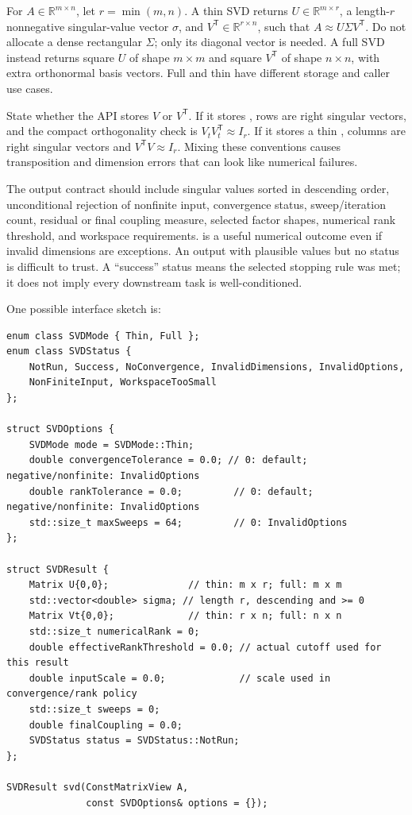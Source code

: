 For \(A\in\mathbb R^{m\times n}\), let \(r=\min(m,n)\). A thin SVD returns \(U\in\mathbb R^{m\times r}\), a length-\(r\) nonnegative singular-value vector \(\sigma\), and \(V^\mathsf T\in\mathbb R^{r\times n}\), such that \(A\approx U\Sigma V^\mathsf T\). Do not allocate a dense rectangular \(\Sigma\); only its diagonal vector is needed. A full SVD instead returns square \(U\) of shape \(m\times m\) and square \(V^\mathsf T\) of shape \(n\times n\), with extra orthonormal basis vectors. Full and thin have different storage and caller use cases.

State whether the API stores \(V\) or \(V^\mathsf T\). If it stores , rows are right singular vectors, and the compact orthogonality check is \(V_tV_t^\mathsf T\approx I_r\). If it stores a thin , columns are right singular vectors and \(V^\mathsf TV\approx I_r\). Mixing these conventions causes transposition and dimension errors that can look like numerical failures.

The output contract should include singular values sorted in descending order, unconditional rejection of nonfinite input, convergence status, sweep/iteration count, residual or final coupling measure, selected factor shapes, numerical rank threshold, and workspace requirements.  is a useful numerical outcome even if invalid dimensions are exceptions. An output with plausible values but no status is difficult to trust. A ``success'' status means the selected stopping rule was met; it does not imply every downstream task is well-conditioned.

One possible interface sketch is:

\begin{verbatim}
enum class SVDMode { Thin, Full };
enum class SVDStatus {
    NotRun, Success, NoConvergence, InvalidDimensions, InvalidOptions,
    NonFiniteInput, WorkspaceTooSmall
};

struct SVDOptions {
    SVDMode mode = SVDMode::Thin;
    double convergenceTolerance = 0.0; // 0: default; negative/nonfinite: InvalidOptions
    double rankTolerance = 0.0;         // 0: default; negative/nonfinite: InvalidOptions
    std::size_t maxSweeps = 64;         // 0: InvalidOptions
};

struct SVDResult {
    Matrix U{0,0};              // thin: m x r; full: m x m
    std::vector<double> sigma; // length r, descending and >= 0
    Matrix Vt{0,0};             // thin: r x n; full: n x n
    std::size_t numericalRank = 0;
    double effectiveRankThreshold = 0.0; // actual cutoff used for this result
    double inputScale = 0.0;             // scale used in convergence/rank policy
    std::size_t sweeps = 0;
    double finalCoupling = 0.0;
    SVDStatus status = SVDStatus::NotRun;
};

SVDResult svd(ConstMatrixView A,
              const SVDOptions& options = {});
\end{verbatim}

